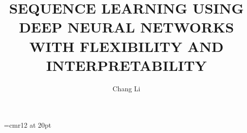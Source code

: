\documentclass{StyFiles/usydthesis}
\renewcommand{\thepage}{\roman{page}}
\begin{document}
\singlespacing
{}  %
\renewcommand{\thepage}{\roman{page}}	
\font\myfont=cmr12 at 20pt 
\title{{\myfont\bf SEQUENCE LEARNING USING DEEP NEURAL NETWORKS WITH FLEXIBILITY AND INTERPRETABILITY}}
\author{Chang Li}
\def\thisauthor{Chang Li}
\def\degree{Doctor of Philosophy}
\def\department{School of Computer Science \\ Faculty of Engineering}
\def\mydegrees{Doctor of Philosophy (Ph.D.)}
\def\supervisor{Dacheng Tao}
\def\assocsupervisora{Dongjin Song}
\maketitle

\onehalfspacing


\cleardoublepage
\pagestyle{empty}


\cleardoublepage
\pagestyle{empty}


\cleardoublepage
\pagestyle{headings}


\cleardoublepage
\pagestyle{headings}
\tableofcontents
\listoffigures
\listoftables

\setcounter{page}{1}  %



\mainmatter












%

\backmatter




\printindex
\end{document}

